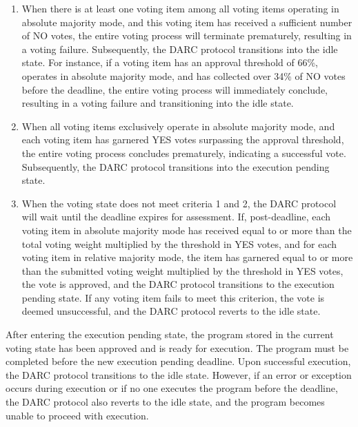 \documentclass[main.tex]{subfiles}
\begin{document}
\begin{enumerate}

    \item When there is at least one voting item among all voting items operating in absolute majority mode, and this voting item has received a sufficient number of NO votes, the entire voting process will terminate prematurely, resulting in a voting failure. Subsequently, the DARC protocol transitions into the idle state. For instance, if a voting item has an approval threshold of 66\%, operates in absolute majority mode, and has collected over 34\% of NO votes before the deadline, the entire voting process will immediately conclude, resulting in a voting failure and transitioning into the idle state.

    \item When all voting items exclusively operate in absolute majority mode, and each voting item has garnered YES votes surpassing the approval threshold, the entire voting process concludes prematurely, indicating a successful vote. Subsequently, the DARC protocol transitions into the execution pending state.
    
    \item When the voting state does not meet criteria 1 and 2, the DARC protocol will wait until the deadline expires for assessment. If, post-deadline, each voting item in absolute majority mode has received equal to or more than the total voting weight multiplied by the threshold in YES votes, and for each voting item in relative majority mode, the item has garnered equal to or more than the submitted voting weight multiplied by the threshold in YES votes, the vote is approved, and the DARC protocol transitions to the execution pending state. If any voting item fails to meet this criterion, the vote is deemed unsuccessful, and the DARC protocol reverts to the idle state.
\end{enumerate}

After entering the execution pending state, the program stored in the current voting state has been approved and is ready for execution. The program must be completed before the new execution pending deadline. Upon successful execution, the DARC protocol transitions to the idle state. However, if an error or exception occurs during execution or if no one executes the program before the deadline, the DARC protocol also reverts to the idle state, and the program becomes unable to proceed with execution.
\end{document}
